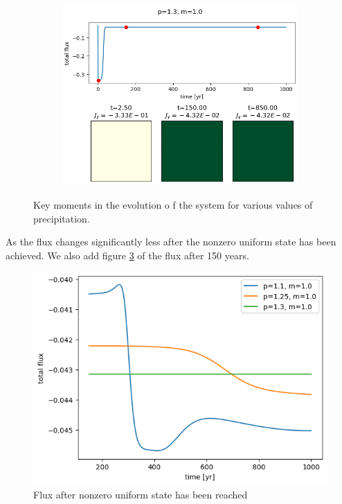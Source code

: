\documentclass{article}
\numberwithin{equation}{section}
\begin{document}
\begin{figure}[!h]
\begin{subfigure}[]{0.5\textwidth}
    \centering
    \includegraphics[scale=0.5]{plots/p1_3_m1_0.png}
     \label{subfig:p13}
\end{subfigure}
    \centering 
    \caption{Key moments in the evolution o f the system for various values of precipitation.}
    \label{fig:key_moments}
\end{figure}
As the flux changes significantly less after the nonzero uniform state has been achieved. We also add figure \ref{fig:flux_dropoff} of the flux after 150 years. 
\begin{figure}[h!]
    \centering
    \includegraphics[scale=0.5]{plots/flux_dropoff.png}
    \caption{Flux after nonzero uniform state has been reached}
    \label{fig:flux_dropoff}
\end{figure}
\end{document}
